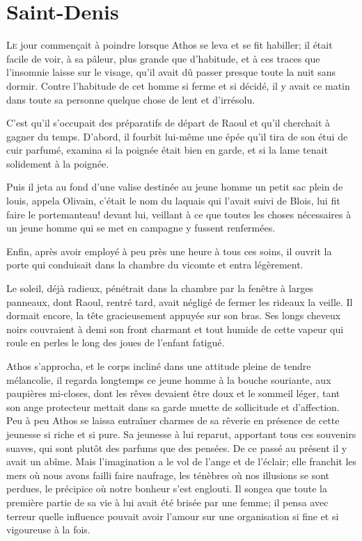 \chapter{Saint-Denis}

\lettrine{L}{e} jour commençait à poindre lorsque Athos se leva et se fit habiller; il était facile de voir, à sa pâleur, plus grande que d'habitude, et à ces traces que l'insomnie laisse sur le visage, qu'il avait dû passer presque toute la nuit sans dormir. Contre l'habitude de cet homme si ferme et si décidé, il y avait ce matin dans toute sa personne quelque chose de lent et d'irrésolu.

C'est qu'il s'occupait des préparatifs de départ de Raoul et qu'il cherchait à gagner du temps. D'abord, il fourbit lui-même une épée qu'il tira de son étui de cuir parfumé, examina si la poignée était bien en garde, et si la lame tenait solidement à la poignée.

Puis il jeta au fond d'une valise destinée au jeune homme un petit sac plein de louis, appela Olivain, c'était le nom du laquais qui l'avait suivi de Blois, lui fit faire le portemanteau! devant lui, veillant à ce que toutes les choses nécessaires à un jeune homme qui se met en campagne y fussent renfermées.

Enfin, après avoir employé à peu près une heure à tous ces soins, il ouvrit la porte qui conduisait dans la chambre du vicomte et entra légèrement.

Le soleil, déjà radieux, pénétrait dans la chambre par la fenêtre à larges panneaux, dont Raoul, rentré tard, avait négligé de fermer les rideaux la veille. Il dormait encore, la tête gracieusement appuyée sur son bras. Ses longs cheveux noirs couvraient à demi son front charmant et tout humide de cette vapeur qui roule en perles le long des joues de l'enfant fatigué.

Athos s'approcha, et le corps incliné dans une attitude pleine de tendre mélancolie, il regarda longtemps ce jeune homme à la bouche souriante, aux paupières mi-closes, dont les rêves devaient être doux et le sommeil léger, tant son ange protecteur mettait dans sa garde muette de sollicitude et d'affection. Peu à peu Athos se laissa entraîner charmes de sa rêverie en présence de cette jeunesse si riche et si pure. Sa jeunesse à lui reparut, apportant tous ces souvenirs suaves, qui sont plutôt des parfums que des pensées. De ce passé au présent il y avait un abîme. Mais l'imagination a le vol de l'ange et de l'éclair; elle franchit les mers où nous avons failli faire naufrage, les ténèbres où nos illusions se sont perdues, le précipice où notre bonheur s'est englouti. Il songea que toute la première partie de sa vie à lui avait été brisée par une femme; il pensa avec terreur quelle influence pouvait avoir l'amour sur une organisation si fine et si vigoureuse à la fois.

